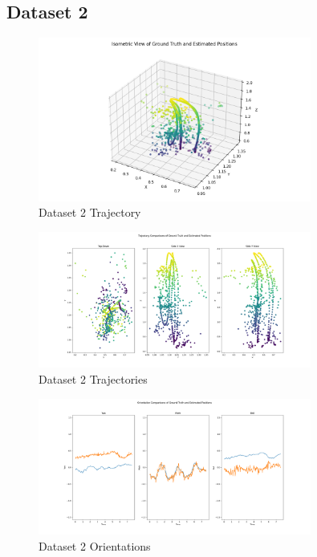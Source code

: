 \documentclass{article}
\begin{document}
\subsection*{Dataset 2}

\begin{figure}[H]
    \centering
    \includegraphics[width=0.8\textwidth]{./imgs/task4/studentdata2_ukf_isometric.png}
    \caption{Dataset 2 Trajectory}
\end{figure}

\begin{figure}[H]
    \centering
    \includegraphics[width=0.8\textwidth]{./imgs/task4/studentdata2_ukf_positions.png}
    \caption{Dataset 2 Trajectories}
\end{figure}

\begin{figure}[H]
    \centering
    \includegraphics[width=0.8\textwidth]{./imgs/task4/studentdata2_ukf_orientations.png}
    \caption{Dataset 2 Orientations}
\end{figure}
\end{document}

